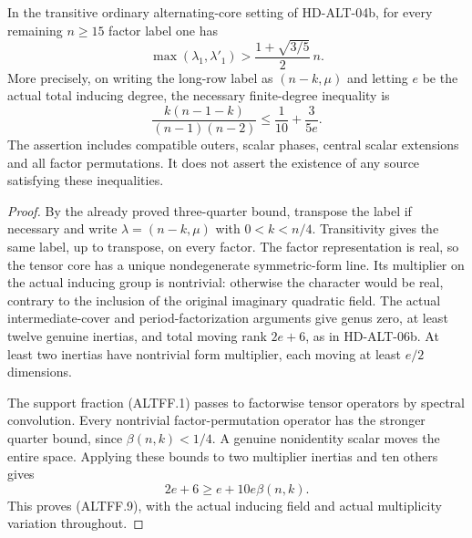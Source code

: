 \begin{theorem}
\label{HD-ALT-07b}
In the transitive ordinary alternating-core setting of HD-ALT-04b,
for every remaining $n\ge15$ factor label one has
\[
 \max(\lambda_1,\lambda'_1)>
                \frac{1+\sqrt{3/5}}2\,n.
 \tag{ALTFF.8}
\]
More precisely, on writing the long-row label as $(n-k,\mu)$ and
letting $e$ be the actual total inducing degree, the necessary
finite-degree inequality is
\[
 \frac{k(n-1-k)}{(n-1)(n-2)}
                   \le\frac1{10}+\frac3{5e}.
 \tag{ALTFF.9}
\]
The assertion includes compatible outers, scalar phases, central scalar
extensions and all factor permutations. It does not assert the existence
of any source satisfying these inequalities.
\end{theorem}

\begin{proof}
By the already proved three-quarter bound, transpose the label if
necessary and write $\lambda=(n-k,\mu)$ with $0<k<n/4$.
Transitivity gives the same label, up to transpose, on every factor.
The factor representation is real, so the tensor core has a unique
nondegenerate symmetric-form line. Its multiplier on the actual
inducing group is nontrivial: otherwise the character would be real,
contrary to the inclusion of the original imaginary quadratic field.
The actual intermediate-cover and period-factorization arguments give
genus zero, at least twelve genuine inertias, and total moving rank
$2e+6$, as in HD-ALT-06b. At least two inertias have nontrivial form
multiplier, each moving at least $e/2$ dimensions.

The support fraction (ALTFF.1) passes to factorwise tensor operators
by spectral convolution. Every nontrivial factor-permutation operator
has the stronger quarter bound, since $\beta(n,k)<1/4$.
A genuine nonidentity scalar moves the entire space. Applying these
bounds to two multiplier inertias and ten others gives
\[
                         2e+6\ge e+10e\beta(n,k).
 \tag{ALTFF.10}
\]
This proves (ALTFF.9), with the actual inducing field and actual
multiplicity variation throughout.


\end{proof}
